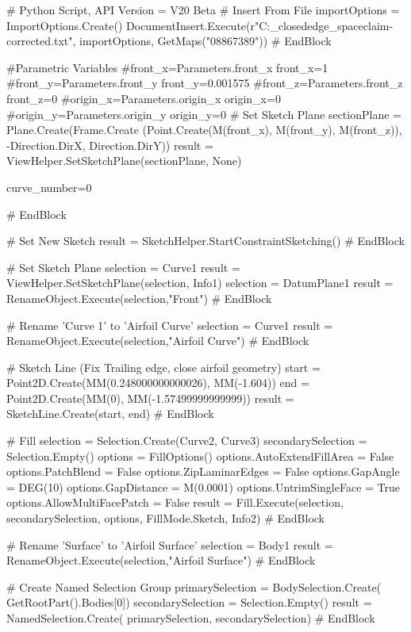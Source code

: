 # Python Script, API Version = V20 Beta
# Insert From File
importOptions = ImportOptions.Create()
DocumentInsert.Execute(r"C:\Users\dhruv\Downloads{}_closededge_spaceclaim-corrected.txt", importOptions, GetMaps("08867389"))
# EndBlock

#Parametric Variables
#front_x=Parameters.front_x
front_x=1
#front_y=Parameters.front_y
front_y=0.001575
#front_z=Parameters.front_z
front_z=0
#origin_x=Parameters.origin_x
origin_x=0
#origin_y=Parameters.origin_y
origin_y=0
# Set Sketch Plane
sectionPlane = Plane.Create(Frame.Create
                            (Point.Create(M(front_x), 
                            M(front_y), M(front_z)), 
-Direction.DirX, 
Direction.DirY))
result = ViewHelper.SetSketchPlane(sectionPlane, None)

curve_number=0


# EndBlock


# Set New Sketch
result = SketchHelper.StartConstraintSketching()
# EndBlock

# Set Sketch Plane
selection = Curve1
result = ViewHelper.SetSketchPlane(selection, Info1)
selection = DatumPlane1
result = RenameObject.Execute(selection,"Front")
# EndBlock


# Rename 'Curve 1' to 'Airfoil Curve'
selection = Curve1
result = RenameObject.Execute(selection,"Airfoil Curve")
# EndBlock




# Sketch Line (Fix Trailing edge, close airfoil geometry)
start = Point2D.Create(MM(0.248000000000026), MM(-1.604))
end = Point2D.Create(MM(0), MM(-1.57499999999999))
result = SketchLine.Create(start, end)
# EndBlock


# Fill
selection = Selection.Create(Curve2, Curve3)
secondarySelection = Selection.Empty()
options = FillOptions()
options.AutoExtendFillArea = False
options.PatchBlend = False
options.ZipLaminarEdges = False
options.GapAngle = DEG(10)
options.GapDistance = M(0.0001)
options.UntrimSingleFace = True
options.AllowMultiFacePatch = False
result = Fill.Execute(selection, 
                      secondarySelection, options, 
                      FillMode.Sketch, Info2)
# EndBlock


# Rename 'Surface' to 'Airfoil Surface'
selection = Body1
result = RenameObject.Execute(selection,"Airfoil Surface")
# EndBlock


# Create Named Selection Group
primarySelection = BodySelection.Create(
    GetRootPart().Bodies[0])
secondarySelection = Selection.Empty()
result = NamedSelection.Create(
    primarySelection, secondarySelection)
# EndBlock



